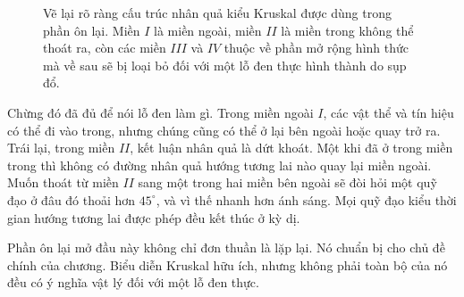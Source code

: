 \begin{figure}[htbp]
\centering
{}
\caption{Vẽ lại rõ ràng cấu trúc nhân quả kiểu Kruskal được dùng trong phần ôn lại. Miền \(I\) là miền ngoài, miền \(II\) là miền trong không thể thoát ra, còn các miền \(III\) và \(IV\) thuộc về phần mở rộng hình thức mà về sau sẽ bị loại bỏ đối với một lỗ đen thực hình thành do sụp đổ.}
\end{figure}

Chừng đó đã đủ để nói lỗ đen làm gì. Trong miền ngoài \(I\), các vật thể và tín hiệu có thể đi vào trong, nhưng chúng cũng có thể ở lại bên ngoài hoặc quay trở ra. Trái lại, trong miền \(II\), kết luận nhân quả là dứt khoát. Một khi đã ở trong miền trong thì không có đường nhân quả hướng tương lai nào quay lại miền ngoài. Muốn thoát từ miền \(II\) sang một trong hai miền bên ngoài sẽ đòi hỏi một quỹ đạo ở đâu đó thoải hơn \(45^\circ\), và vì thế nhanh hơn ánh sáng. Mọi quỹ đạo kiểu thời gian hướng tương lai được phép đều kết thúc ở kỳ dị.

Phần ôn lại mở đầu này không chỉ đơn thuần là lặp lại. Nó chuẩn bị cho chủ đề chính của chương. Biểu diễn Kruskal hữu ích, nhưng không phải toàn bộ của nó đều có ý nghĩa vật lý đối với một lỗ đen thực.

\begin{classroomqa}
\end{classroomqa}

